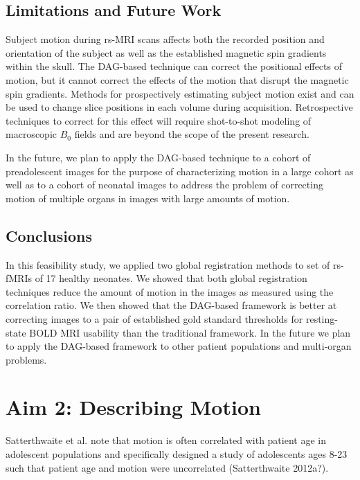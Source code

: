 \subsection{Limitations and Future Work}

Subject motion during rs-MRI scans affects both the recorded position and orientation of the subject as well as the established magnetic spin gradients within the skull. The DAG-based technique can correct the positional effects of motion, but it cannot correct the effects of the motion that disrupt the magnetic spin gradients. Methods for prospectively estimating subject motion exist and can be used to change slice positions in each volume during acquisition. Retrospective techniques to correct for this effect will require shot-to-shot modeling of macroscopic $B_0$ fields and are beyond the scope of the present research.

In the future, we plan to apply the DAG-based technique to a cohort of preadolescent images for the purpose of characterizing motion in a large cohort as well as to a cohort of neonatal images to address the problem of correcting motion of multiple organs in images with large amounts of motion.  

\subsection{Conclusions}

In this feasibility study, we applied two global registration methods to set of rs-fMRIs of 17 healthy neonates. We showed that both global registration techniques reduce the amount of motion in the images as measured using the correlation ratio. We then showed that the DAG-based framework is better at correcting images to a pair of established gold standard thresholds for resting-state BOLD MRI usability than the traditional framework. In the future we plan to apply the DAG-based framework to other patient populations and multi-organ problems.

\section{Aim 2: Describing Motion}

Satterthwaite et al. note that motion is often correlated with patient age in adolescent populations and specifically designed a study of adolescents ages 8-23 such that patient age and motion were uncorrelated (Satterthwaite 2012a?).